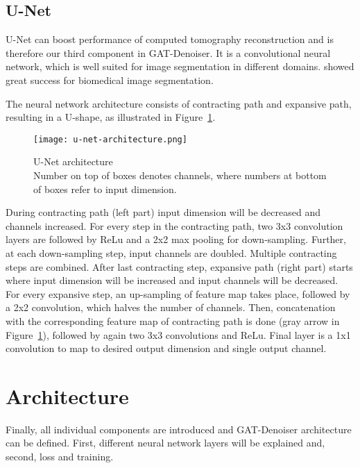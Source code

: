 \subsection{U-Net}
\label{sec:unet}
U-Net can boost performance of computed tomography reconstruction and is therefore our third component
in GAT-Denoiser.
It is a convolutional neural network, which is well suited for image segmentation in different domains.
\cite{unet-tomography} showed great success for biomedical image segmentation.

The neural network architecture consists of contracting path and expansive path,
resulting in a U-shape, as illustrated in Figure~\ref{fig:u-net-architectue}.

\begin{figure}[H]
  \centering
  \label{fig:u-net-architectue}
  \texttt{[image: u-net-architecture.png]}
  \caption{
    U-Net architecture \cite[p 2, Fig. 1]{unet-tomography} \\
    Number on top of boxes denotes channels, where numbers at bottom of boxes refer to input dimension.
    }
\end{figure}


During contracting path (left part) input dimension will be decreased and channels increased.
For every step in the contracting path, two 3x3 convolution layers are followed by ReLu
and a 2x2 max pooling for down-sampling. Further, at each down-sampling step, input channels are doubled.
Multiple contracting steps are combined. After last contracting step, expansive path (right part) starts
where input dimension will be increased and input channels will be decreased.
For every expansive step, an up-sampling of feature map takes place, followed by a 2x2 convolution, 
which halves the number of channels. Then, concatenation with the corresponding feature
map of contracting path is done (gray arrow in Figure~\ref{fig:u-net-architectue}), followed by again two 3x3 convolutions and ReLu.
Final layer is a 1x1 convolution to map to desired output dimension and single output channel.

\section{Architecture}
\label{sec:architecture-GatDenoiser}
Finally, all individual components are introduced and GAT-Denoiser architecture can be defined.
First, different neural network layers will be explained and, second, loss and training.

